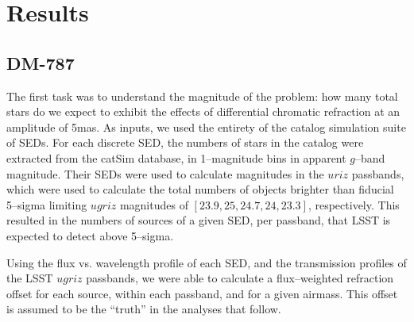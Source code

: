 \documentclass[DM,toc]{lsstdoc}
\begin{document}
\section{Results}

\subsection{\bf DM-787}

The first task was to understand the magnitude of the problem: how
many total stars do we expect to exhibit the effects of differential
chromatic refraction at an amplitude of 5mas.  As inputs, we used the
entirety of the catalog simulation suite of SEDs.  For each discrete
SED, the numbers of stars in the catalog were extracted from the
catSim database, in 1--magnitude bins in apparent $g$--band magnitude.
Their SEDs were used to calculate magnitudes in the $uriz$ passbands,
which were used to calculate the total numbers of objects brighter
than fiducial 5--sigma limiting $ugriz$ magnitudes of $[23.9, 25,
  24.7, 24, 23.3]$, respectively.  This resulted in the numbers of
sources of a given SED, per passband, that LSST is expected to detect
above 5--sigma.

Using the flux vs. wavelength profile of each SED, and the
transmission profiles of the LSST $ugriz$ passbands, we were able to
calculate a flux--weighted refraction offset for each source, within
each passband, and for a given airmass.  This offset is assumed to be
the ``truth'' in the analyses that follow.
\end{document}
